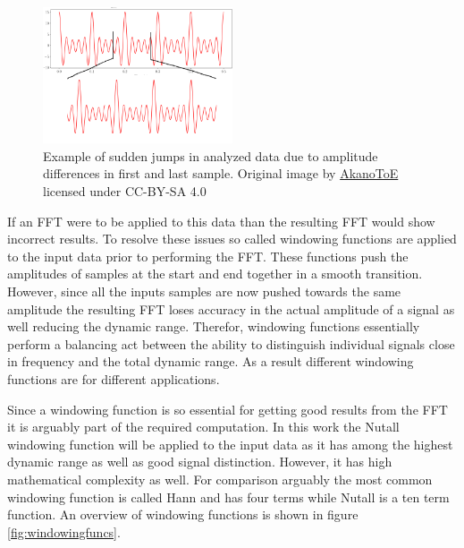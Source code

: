 \documentclass[conference]{IEEEtran}
\begin{document}
\begin{center}
	\begin{figure}[H]
		\includegraphics[width=0.5\textwidth]{resources/images/windowing-cc-by-sa-4-akantoe-wiki.png}
		\captionsetup{justification=centering}
		\caption{Example of sudden jumps in analyzed data due to amplitude
			differences in first and last sample. Original image by
			\href{https://commons.wikimedia.org/wiki/User:AkanoToE}{AkanoToE}
			licensed under CC-BY-SA 4.0}
		\label{fig:consampling}
	\end{figure}
\end{center}

If an FFT were to be applied to this data than the resulting FFT would show
incorrect results. To resolve these issues so called windowing functions are
applied to the input data prior to performing the FFT. These functions push
the amplitudes of samples at the start and end together in a smooth
transition. However, since all the inputs samples are now pushed towards the
same amplitude the resulting FFT loses accuracy in the actual amplitude of a
signal as well reducing the dynamic range. Therefor, windowing functions
essentially perform a balancing act between the ability to distinguish
individual signals close in frequency and the total dynamic range. As a result
different windowing functions are for different applications.

Since a windowing function is so essential for getting good results from the
FFT it is arguably part of the required computation. In this work the Nutall
windowing function will be applied to the input data as it has among the
highest dynamic range as well as good signal distinction. However, it has
high mathematical complexity as well. For comparison arguably the most common
windowing function is called Hann and has four terms while Nutall is a ten
term function. An overview of windowing functions is shown in
figure \ref{fig:windowingfuncs}.
\end{document}
